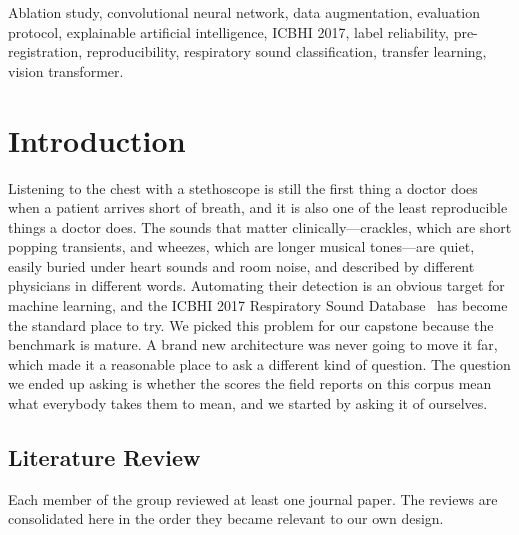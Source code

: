 \documentclass[journal,onecolumn]{IEEEtran}
\begin{document}
\begin{IEEEkeywords}
Ablation study, convolutional neural network, data augmentation, evaluation protocol,
explainable artificial intelligence, ICBHI 2017, label reliability, pre-registration,
reproducibility, respiratory sound classification, transfer learning, vision transformer.
\end{IEEEkeywords}

\section{Introduction}
\label{sec:intro}

Listening to the chest with a stethoscope is still the first thing a doctor does when a
patient arrives short of breath, and it is also one of the least reproducible things a
doctor does. The sounds that matter clinically---crackles, which are short popping
transients, and wheezes, which are longer musical tones---are quiet, easily buried under
heart sounds and room noise, and described by different physicians in different words.
Automating their detection is an obvious target for machine learning, and the ICBHI 2017
Respiratory Sound Database~\cite{rocha2019icbhi} has become the standard place to try. We
picked this problem for our capstone because the benchmark is mature. A brand new
architecture was never going to move it far, which made it a reasonable place to ask a
different kind of question. The question we ended up asking is whether the scores the
field reports on this corpus mean what everybody takes them to mean, and we started by
asking it of ourselves.

\subsection{Literature Review}
\label{subsec:lit}

Each member of the group reviewed at least one journal paper. The reviews are consolidated
here in the order they became relevant to our own design.
\end{document}

